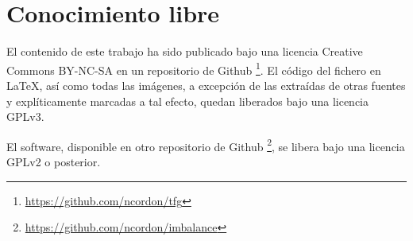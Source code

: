 \section{Conocimiento libre}
 El contenido de este trabajo ha sido publicado bajo una licencia Creative Commons BY-NC-SA en un repositorio de Github 
 \footnote{\url{https://github.com/ncordon/tfg}}. El código del fichero en \LaTeX, así como todas las imágenes, a excepción
 de las extraídas de otras fuentes y explíticamente marcadas a tal efecto, quedan liberados bajo una licencia GPLv3.
 
 El software, disponible en otro repositorio de Github \footnote{\url{https://github.com/ncordon/imbalance}}, se libera bajo
 una licencia GPLv2 o posterior.